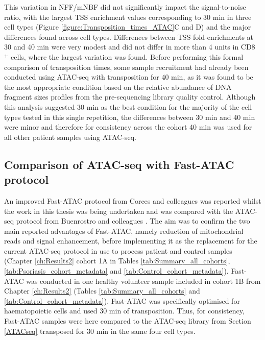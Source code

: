 This variation in NFF/mNBF did not significantly impact the signal-to-noise ratio, with the largest TSS enrichment values corresponding to 30 min in three cell types (Figure \ref{figure:Transposition_times_ATAC}C and D) and the major differences found across cell types. Differences between TSS fold-enrichments at 30 and 40 min were very modest and did not differ in more than 4 units in CD8 $^+$ cells, where the largest variation was found. Before performing this formal comparison of transposition times, some sample recruitment had already been conducted using ATAC-seq with transposition for 40 min, as it was found to be the most appropriate condition based on the relative abundance of DNA fragment sizes profiles from the pre-sequencing library quality control. Although this analysis suggested 30 min as the best condition for the majority of the cell types tested in this single repetition, the differences between 30 min and 40 min were minor and therefore for consistency across the cohort 40 min was used for all other patient samples using ATAC-seq. 




\subsection{Comparison of ATAC-seq with Fast-ATAC protocol}
\label{Fast_ATAC}

An improved Fast-ATAC protocol from Corces and colleagues \parencite{Corces2016} was reported whilst the work in this thesis was being undertaken and was compared with the ATAC-seq protocol from Buenrostro and colleagues \parencite{Buenrostro2013}. The aim was to confirm the two main reported advantages of Fast-ATAC, namely reduction of mitochondrial reads and signal enhancement, before implementing it as the replacement for the current ATAC-seq protocol in use to process patient and control samples (Chapter \ref{ch:Results2} cohort 1A in Tables \ref{tab:Summary_all_cohorts}, \ref{tab:Psoriasis_cohort_metadata} and \ref{tab:Control_cohort_metadata}). Fast-ATAC was conducted in one healthy volunteer sample included in cohort 1B from Chapter \ref{ch:Results2} (Tables \ref{tab:Summary_all_cohorts} and \ref{tab:Control_cohort_metadata}). Fast-ATAC was specifically optimised for haematopoietic cells and used 30 min of transposition. Thus, for consistency, Fast-ATAC samples were here compared to the ATAC-seq library from Section \ref{ATACseq} transposed for 30 min in the same four cell types.


